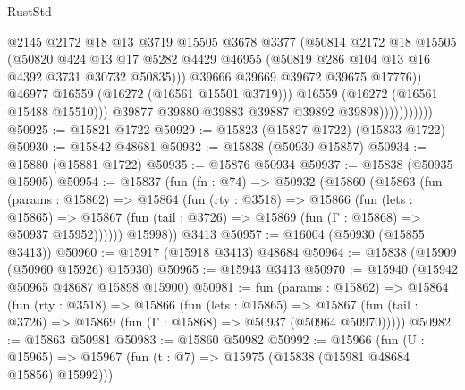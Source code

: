 \begin{lexlean}{RustStd}
\begin{coremodule}
                                  @2145
                                  @2172
                                  @18
                                  @13
                                  @3719
                                  @15505
                                  @3678
                                  @3377
                                  (@50814
                                    @2172
                                    @18
                                    @15505
                                    (@50820
                                      @424
                                      @13
                                      @17
                                      @5282
                                      @4429
                                      @46955
                                      (@50819 @286 @104 @13 @16 @4392 @3731 @30732 @50835)))
                                  @39666
                                  @39669
                                  @39672
                                  @39675
                                  @17776))
                              @46977
                              @16559
                              (@16272 (@16561 @15501 @3719)))
                            @16559
                            (@16272 (@16561 @15488 @15510)))
                          @39877
                          @39880
                          @39883
                          @39887
                          @39892
                          @39898)))))))))))
@50925 := @15821 @1722
@50929 := @15823 (@15827 @1722) (@15833 @1722)
@50930 := @15842 @48681
@50932 := @15838 (@50930 @15857)
@50934 := @15880 (@15881 @1722)
@50935 := @15876 @50934
@50937 := @15838 (@50935 @15905)
@50954 := @15837
    (fun (fn : @74) =>
    @50932
      (@15860
        (@15863
          (fun (params : @15862) =>
          @15864
            (fun (rty : @3518) =>
            @15866
              (fun (lets : @15865) =>
              @15867 (fun (tail : @3726) => @15869 (fun (Γ : @15868) => @50937 @15952))))))
        @15998))
    @3413
@50957 := @16004 (@50930 (@15855 @3413))
@50960 := @15917 (@15918 @3413) @48684
@50964 := @15838 (@15909 (@50960 @15926) @15930)
@50965 := @15943 @3413
@50970 := @15940 (@15942 @50965 @48687 @15898 @15900)
@50981 := fun (params : @15862) =>
  @15864
    (fun (rty : @3518) =>
    @15866
      (fun (lets : @15865) =>
      @15867 (fun (tail : @3726) => @15869 (fun (Γ : @15868) => @50937 (@50964 @50970)))))
@50982 := @15863 @50981
@50983 := @15860 @50982
@50992 := @15966
    (fun (U : @15965) => @15967 (fun (t : @7) => @15975 (@15838 (@15981 @48684 @15856) @15992)))

\end{coremodule}
\end{lexlean}
